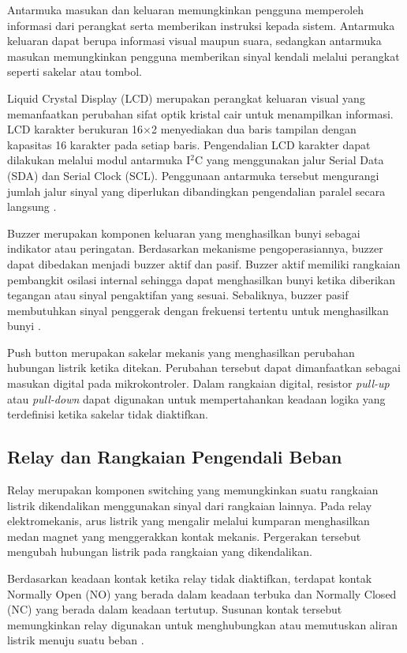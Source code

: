 Antarmuka masukan dan keluaran memungkinkan pengguna memperoleh informasi dari perangkat serta memberikan instruksi kepada sistem. Antarmuka keluaran dapat berupa informasi visual maupun suara, sedangkan antarmuka masukan memungkinkan pengguna memberikan sinyal kendali melalui perangkat seperti sakelar atau tombol.

Liquid Crystal Display (LCD) merupakan perangkat keluaran visual yang memanfaatkan perubahan sifat optik kristal cair untuk menampilkan informasi. LCD karakter berukuran 16$\times$2 menyediakan dua baris tampilan dengan kapasitas 16 karakter pada setiap baris. Pengendalian LCD karakter dapat dilakukan melalui modul antarmuka I$^2$C yang menggunakan jalur Serial Data (SDA) dan Serial Clock (SCL). Penggunaan antarmuka tersebut mengurangi jumlah jalur sinyal yang diperlukan dibandingkan pengendalian paralel secara langsung \cite{nxp_i2c,adafruit_lcd}.

Buzzer merupakan komponen keluaran yang menghasilkan bunyi sebagai indikator atau peringatan. Berdasarkan mekanisme pengoperasiannya, buzzer dapat dibedakan menjadi buzzer aktif dan pasif. Buzzer aktif memiliki rangkaian pembangkit osilasi internal sehingga dapat menghasilkan bunyi ketika diberikan tegangan atau sinyal pengaktifan yang sesuai. Sebaliknya, buzzer pasif membutuhkan sinyal penggerak dengan frekuensi tertentu untuk menghasilkan bunyi \cite{active_buzzer}.

Push button merupakan sakelar mekanis yang menghasilkan perubahan hubungan listrik ketika ditekan. Perubahan tersebut dapat dimanfaatkan sebagai masukan digital pada mikrokontroler. Dalam rangkaian digital, resistor \textit{pull-up} atau \textit{pull-down} dapat digunakan untuk mempertahankan keadaan logika yang terdefinisi ketika sakelar tidak diaktifkan.

\subsection{Relay dan Rangkaian Pengendali Beban}
\label{subsec:relay_driver}

Relay merupakan komponen switching yang memungkinkan suatu rangkaian listrik dikendalikan menggunakan sinyal dari rangkaian lainnya. Pada relay elektromekanis, arus listrik yang mengalir melalui kumparan menghasilkan medan magnet yang menggerakkan kontak mekanis. Pergerakan tersebut mengubah hubungan listrik pada rangkaian yang dikendalikan.

Berdasarkan keadaan kontak ketika relay tidak diaktifkan, terdapat kontak Normally Open (NO) yang berada dalam keadaan terbuka dan Normally Closed (NC) yang berada dalam keadaan tertutup. Susunan kontak tersebut memungkinkan relay digunakan untuk menghubungkan atau memutuskan aliran listrik menuju suatu beban \cite{omron_relay}.

